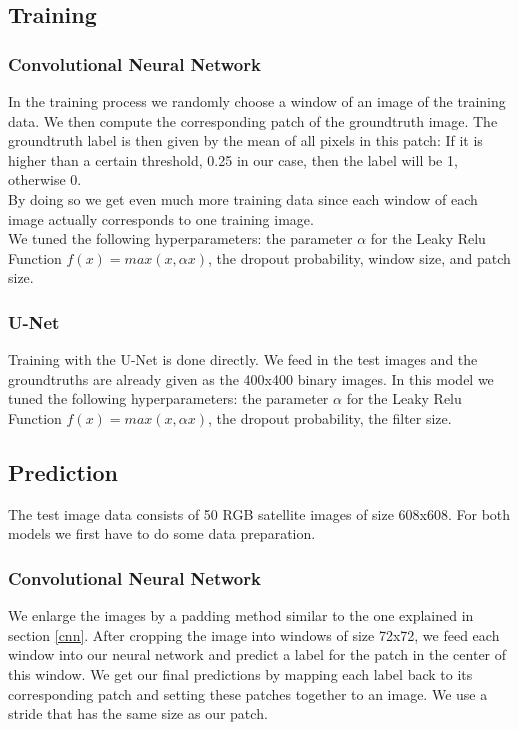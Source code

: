 \documentclass[10pt,conference,compsocconf]{IEEEtran}
\begin{document}
\subsection{Training}
\label{training}

\subsubsection{Convolutional Neural Network}
In the training process we randomly choose a window of an image of the training data. We then compute the corresponding patch of the groundtruth image. The groundtruth label is then given by the mean of all pixels in this patch: If it is higher than a certain threshold, 0.25 in our case, then the label will be 1, otherwise 0.\\
By doing so we get even much more training data since each window of each image actually  corresponds to one training image. \\We tuned the following hyperparameters: the parameter  $\alpha$ for the Leaky Relu Function $f(x)=max(x,\alpha x)$, the dropout probability, window size, and patch size. \\

\subsubsection{U-Net}
Training with the U-Net is done directly. We feed in the test images and the groundtruths are already given as the 400x400 binary images. In this model we tuned the following hyperparameters: the parameter  $\alpha$ for the Leaky Relu Function $f(x)=max(x,\alpha x)$, the dropout probability, the filter size. \\

\subsection{Prediction}
The test image data consists of 50 RGB satellite images of size 608x608. For both models we first have to do some data preparation.\\

\subsubsection{Convolutional Neural Network}
We enlarge the images by a padding method similar to the one explained in section \ref{cnn}. After cropping the image into windows of size 72x72, we feed each window into our neural network and predict a label for the patch in the center of this window. We get our final predictions by mapping each label back to its corresponding patch and setting these patches together to an image.
We use a stride that has the same size as our patch. \\
\end{document}

